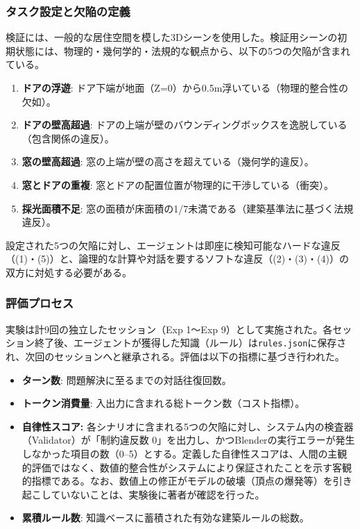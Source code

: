 \documentclass[dvipdfmx, a4paper, 9pt]{deimj}
\begin{document}
\subsubsection{タスク設定と欠陥の定義}

検証には、一般的な居住空間を模した3Dシーンを使用した。検証用シーンの初期状態には、物理的・幾何学的・法規的な観点から、以下の5つの欠陥が含まれている。

\begin{enumerate}
  \item \textbf{ドアの浮遊}: ドア下端が地面（Z=0）から0.5m浮いている（物理的整合性の欠如）。
  \item \textbf{ドアの壁高超過}: ドアの上端が壁のバウンディングボックスを逸脱している（包含関係の違反）。
  \item \textbf{窓の壁高超過}: 窓の上端が壁の高さを超えている（幾何学的違反）。
  \item \textbf{窓とドアの重複}: 窓とドアの配置位置が物理的に干渉している（衝突）。
  \item \textbf{採光面積不足}: 窓の面積が床面積の1/7未満である（建築基準法に基づく法規違反）。
\end{enumerate}

設定された5つの欠陥に対し、エージェントは即座に検知可能なハードな違反（(1)・(5)）と、論理的な計算や対話を要するソフトな違反（(2)・(3)・(4)）の双方に対処する必要がある。

\subsubsection{評価プロセス}

実験は計9回の独立したセッション（Exp 1〜Exp 9）として実施された。各セッション終了後、エージェントが獲得した知識（ルール）は\texttt{rules.json}に保存され、次回のセッションへと継承される。評価は以下の指標に基づき行われた。

\begin{itemize}
    \item \textbf{ターン数}: 問題解決に至るまでの対話往復回数。
    \item \textbf{トークン消費量}: 入出力に含まれる総トークン数（コスト指標）。
    \item \textbf{自律性スコア:} 
    各シナリオに含まれる5つの欠陥に対し、システム内の検査器（Validator）が「制約違反数 0」を出力し、かつBlenderの実行エラーが発生しなかった項目の数（0--5）とする。定義した自律性スコアは、人間の主観的評価ではなく、数値的整合性がシステムにより保証されたことを示す客観的指標である。なお、数値上の修正がモデルの破壊（頂点の爆発等）を引き起こしていないことは、実験後に著者が確認を行った。
    \item \textbf{累積ルール数}: 知識ベースに蓄積された有効な建築ルールの総数。
\end{itemize}
\end{document}
